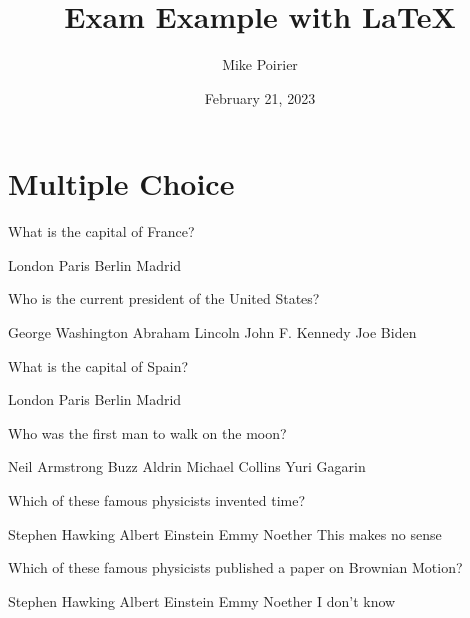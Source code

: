 \documentclass[answers]{exam}
\title{\textbf{Exam Example with \LaTeX \space [Answers]}}
\author{Mike Poirier}
\date{February 21, 2023}
\begin{document}
\maketitle

\section{Multiple Choice}

\begin{questions}

\question What is the capital of France?

\begin{randomizechoices}
\choice London
\correctchoice Paris
\choice Berlin
\choice Madrid
\end{randomizechoices}

\question Who is the current president of the United States?

\begin{randomizechoices}
\choice George Washington
\choice Abraham Lincoln
\choice John F. Kennedy
\correctchoice Joe Biden
\end{randomizechoices}

\question What is the capital of Spain?

\begin{randomizechoices}
\choice London
\choice Paris
\choice Berlin
\correctchoice Madrid
\end{randomizechoices}

\question Who was the first man to walk on the moon?

\begin{randomizechoices}
\correctchoice Neil Armstrong
\choice Buzz Aldrin
\choice Michael Collins
\choice Yuri Gagarin
\end{randomizechoices}

\question Which of these famous physicists invented time?

\begin{oneparchoices}
 \choice Stephen Hawking 
 \choice Albert Einstein
 \choice Emmy Noether
 \correctchoice This makes no sense
\end{oneparchoices}
    
\question Which of these famous physicists published a paper on Brownian Motion?

\begin{checkboxes}
 \choice Stephen Hawking 
 \correctchoice Albert Einstein
 \choice Emmy Noether
 \choice I don't know
\end{checkboxes}


\end{questions}
\end{document}
